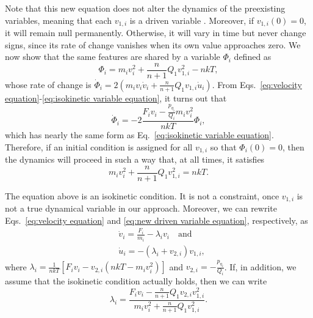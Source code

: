 \documentclass[
aip,
jcp,
reprint,
]{revtex4-1}
\newcommand{\nn}{n}
\begin{document}
Note that this new equation does not alter the dynamics of the preexisting variables, meaning that each $v_{1,i}$ is a driven variable \cite{Tuckerman_1999, Tuckerman_2001a}.
Moreover, if $v_{1,i}(0) = 0$, it will remain null permanently.
Otherwise, it will vary in time but never change signs, since its rate of change vanishes when its own value approaches zero.
We now show that the same features are shared by a variable $\Phi_i$ defined as
\begin{equation}
\label{eq:isokinetic variable equation}
\Phi_i = m_i v_i^2 + \frac{\nn}{\nn+1} Q_1 v_{1,i}^2 - \nn k T,
\end{equation}
whose rate of change is $\dot{\Phi}_i = 2 (m_i v_i \dot{v}_i + \frac{\nn}{\nn+1} Q_1 v_{1,i} \dot{u}_i)$.
From Eqs.~\eqref{eq:velocity equation}-\eqref{eq:isokinetic variable equation}, it turns out that
\begin{equation*}
\dot{\Phi}_i = - 2 \frac{F_i v_i - \frac{p_{\eta_i}}{Q_i} m_i v_i^2}{\nn k T} \Phi_i,
\end{equation*}
which has nearly the same form as Eq.~\eqref{eq:isokinetic variable equation}.
Therefore, if an initial condition is assigned for all $v_{1,i}$ so that $\Phi_i(0) = 0$, then the dynamics will proceed in such a way that, at all times, it satisfies
\begin{equation}
\label{eq:isokinetic condition}
m_i v_i^2 + \frac{\nn}{\nn+1} Q_1 v_{1,i}^2 = \nn k T.
\end{equation}

The equation above is an isokinetic condition.
It is not a constraint, once $v_{1,i}$ is not a true dynamical variable in our approach.
Moreover, we can rewrite Eqs.~\eqref{eq:velocity equation} and \eqref{eq:new driven variable equation}, respectively, as
\begin{subequations}
\label{eq:isokinetic equations of motion}
\begin{align}
&\dot{v}_i = \frac{F_i}{m_i} - \lambda_i v_i \quad \mathrm{and} \\
&\dot{u}_i = -(\lambda_i + v_{2,i}) v_{1,i},
\end{align}
\end{subequations}
where $\lambda_i = \frac{1}{\nn k T} [F_i v_i - v_{2,i} (\nn k T - m_i v_i^2)]$ and $v_{2,i} = -\frac{p_{\eta_i}}{Q_i}$.
If, in addition, we assume that the isokinetic condition actually holds, then we can write
\begin{equation}
\lambda_i = \frac{F_i v_i - \frac{\nn}{\nn+1} Q_1 v_{2,i} v_{1,i}^2}{m_i v_i^2 + \frac{\nn}{\nn+1} Q_1 v_{1,i}^2}.
\end{equation}
\end{document}
